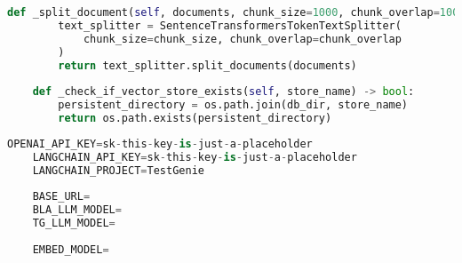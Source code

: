 \begin{lstlisting}[language=Python, caption={$\texttt{AI\_Agent}$ class.}, label={lst:12}]
    def _split_document(self, documents, chunk_size=1000, chunk_overlap=100):
        text_splitter = SentenceTransformersTokenTextSplitter(
            chunk_size=chunk_size, chunk_overlap=chunk_overlap
        )
        return text_splitter.split_documents(documents)
    
    def _check_if_vector_store_exists(self, store_name) -> bool:
        persistent_directory = os.path.join(db_dir, store_name)
        return os.path.exists(persistent_directory)

\end{lstlisting}

\begin{lstlisting}[language=Python, caption={$\texttt{Sample .env}$ file.}, label={lst:13}]
    OPENAI_API_KEY=sk-this-key-is-just-a-placeholder
    LANGCHAIN_API_KEY=sk-this-key-is-just-a-placeholder
    LANGCHAIN_PROJECT=TestGenie
    
    BASE_URL=
    BLA_LLM_MODEL=
    TG_LLM_MODEL=
    
    EMBED_MODEL=
\end{lstlisting}